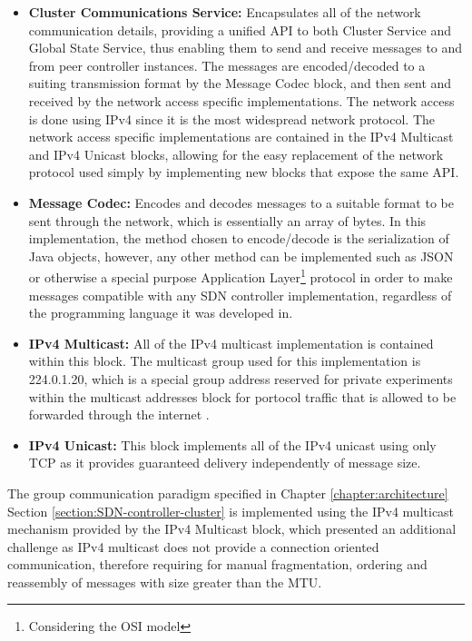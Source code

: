 \begin{itemize}
	\item \textbf{Cluster Communications Service:} Encapsulates all of the network communication details, providing a unified \gls{API} to both Cluster Service and Global State Service, thus enabling them to send and receive messages to and from peer controller instances. The messages are encoded/decoded to a suiting transmission format by the Message Codec block, and then sent and received by the network access specific implementations. The network access is done using \gls{IPv4} since it is the most widespread network protocol. The network access specific implementations are contained in the IPv4 Multicast and IPv4 Unicast blocks, allowing for the easy replacement of the network protocol used simply by implementing new blocks that expose the same \gls{API}.
	\item \textbf{Message Codec:} Encodes and decodes messages to a suitable format to be sent through the network, which is essentially an array of bytes. In this implementation, the method chosen to encode/decode is the serialization of Java objects, however, any other method can be implemented such as \gls{JSON} or otherwise a special purpose Application Layer\footnote{Considering the \gls{OSI} model} protocol in order to make messages compatible with any \gls{SDN} controller implementation, regardless of the programming language it was developed in.
	\item \textbf{IPv4 Multicast:} All of the \gls{IPv4} multicast implementation is contained within this block. The multicast group used for this implementation is 224.0.1.20, which is a special group address reserved for private experiments \cite{ReservedMulticastGroups} within the multicast addresses block for portocol traffic that is allowed to be forwarded through the internet \cite{rfc5771}.
	\item \textbf{IPv4 Unicast:} This block implements all of the \gls{IPv4} unicast using only \gls{TCP} as it provides guaranteed delivery independently of message size.
\end{itemize}
%
%
The group communication paradigm specified in Chapter \ref*{chapter:architecture} Section \ref{section:SDN-controller-cluster} is implemented using the \gls{IPv4} multicast mechanism provided by the IPv4 Multicast block, which presented an additional challenge as \gls{IPv4} multicast does not provide a connection oriented communication, therefore requiring for manual fragmentation, ordering and reassembly of messages with size greater than the \gls{MTU}.
